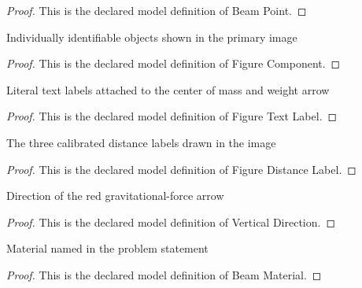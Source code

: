 \begin{proof}
  This is the declared model definition of Beam Point.
\end{proof}
\begin{definition}
  \label{def:physics:phyx-mini-0702:phyxminiproblems-problemphyxmini0702-figurecomponent}
  Individually identifiable objects shown in the primary image
\end{definition}
\begin{proof}
  This is the declared model definition of Figure Component.
\end{proof}
\begin{definition}
  \label{def:physics:phyx-mini-0702:phyxminiproblems-problemphyxmini0702-figuretextlabel}
  Literal text labels attached to the center of mass and weight arrow
\end{definition}
\begin{proof}
  This is the declared model definition of Figure Text Label.
\end{proof}
\begin{definition}
  \label{def:physics:phyx-mini-0702:phyxminiproblems-problemphyxmini0702-figuredistancelabel}
  The three calibrated distance labels drawn in the image
\end{definition}
\begin{proof}
  This is the declared model definition of Figure Distance Label.
\end{proof}
\begin{definition}
  \label{def:physics:phyx-mini-0702:phyxminiproblems-problemphyxmini0702-verticaldirection}
  Direction of the red gravitational-force arrow
\end{definition}
\begin{proof}
  This is the declared model definition of Vertical Direction.
\end{proof}
\begin{definition}
  \label{def:physics:phyx-mini-0702:phyxminiproblems-problemphyxmini0702-beammaterial}
  Material named in the problem statement
\end{definition}
\begin{proof}
  This is the declared model definition of Beam Material.
\end{proof}
